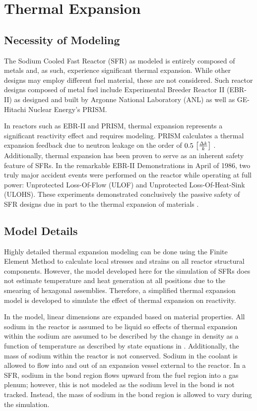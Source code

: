\chapter{Thermal Expansion}
\label{ch:thermalExpansion}

\section{Necessity of Modeling}
  The Sodium Cooled Fast Reactor (SFR) as modeled is entirely composed of
  metals and, as such, experience significant thermal expansion. While other 
  designs may employ different fuel material, these are not considered. Such
  reactor designs composed of metal fuel include Experimental Breeder Reactor II
  (EBR-II) as designed and built by Argonne National Laboratory (ANL) as well as
  GE-Hitachi Nuclear Energy's PRISM. 

  In reactors such as EBR-II and PRISM, thermal expansion represents a
  significant reactivity effect and requires modeling. PRISM calculates a 
  thermal expansion feedback due to neutron leakage on the order of 
  $0.5 \,\left[\text{{$\frac{\Delta k}{k}$}}\right]$ \cite{GEFR793}. Additionally, thermal
  expansion has been proven to serve as an inherent safety feature of SFRs. In
  the remarkable EBR-II Demonstrations in April of 1986, two truly major
  accident events were performed on the reactor while operating at full power:
  Unprotected Loss-Of-Flow (ULOF) and Unprotected Loss-Of-Heat-Sink (ULOHS).
  These experiments demonstrated conclusively the passive safety of SFR designs
  due in part to the thermal expansion of materials \cite{PlentifulEnergy}.

\section{Model Details}
  \label{sec:model_details}
  Highly detailed thermal expansion modeling can be done using the Finite
  Element Method to calculate local stresses and strains on all reactor
  structural components. However, the model developed here for the simulation of
  SFRs does not estimate temperature and heat generation at all positions due to
  the smearing of hexagonal assemblies. Therefore, a simplified thermal
  expansion model is developed to simulate the effect of thermal expansion on
  reactivity.

  In the model, linear dimensions are expanded based on material properties.
  All sodium in the reactor is assumed to be liquid so effects of thermal
  expansion within the sodium are assumed to be described by the change in
  density as a function of temperature as described by state equations in
  \cite{sodiumProp}. Additionally, the mass of sodium within the reactor is not
  conserved. Sodium in the coolant is allowed to flow into and out of an
  expansion vessel external to the reactor. In a SFR, sodium in the bond region
  flows upward from the fuel region into a gas plenum; however, this is not
  modeled as the sodium level in the bond is not tracked. Instead, the mass of
  sodium in the bond region is allowed to vary during the simulation.

